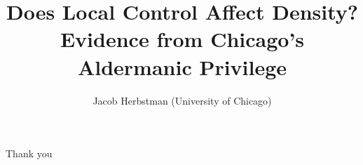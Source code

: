 \documentclass[11pt,notes=hide,aspectratio=169,mathserif]{beamer}
\title[Aldermanic Privilege]{Does Local Control Affect Density? Evidence from Chicago's Aldermanic Privilege}
\author[Jacob Herbstman]{Jacob Herbstman (University of Chicago)}
\date{\monthname[\the\month] \the\year}
\begin{document}
\begin{frame}[plain]
\titlepage
\note{
	\begin{itemize}
	\end{itemize}
}
\end{frame}


\begin{frame}[plain]
\begin{center}{\LARGE Thank you}\end{center}
\end{frame}


\appendix
%

%
\end{document}
